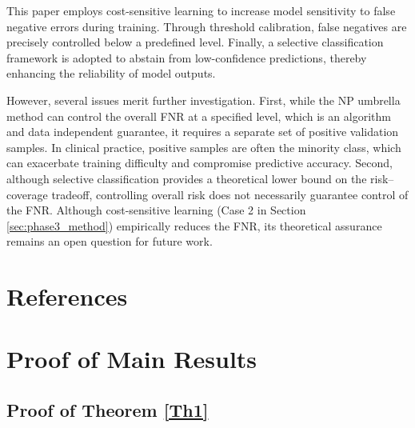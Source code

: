 \documentclass[journal,twoside,web]{ieeecolor}
\begin{document}
This paper employs cost-sensitive learning to increase model sensitivity to false negative errors during training. Through threshold calibration, false negatives are precisely controlled below a predefined level. Finally, a selective classification framework is adopted to abstain from low-confidence predictions, thereby enhancing the reliability of model outputs.

However, several issues merit further investigation. First, while the NP umbrella method can control the overall FNR at a specified level, which is an algorithm and data independent guarantee, it requires a separate set of positive validation samples. In clinical practice, positive samples are often the minority class, which can exacerbate training difficulty and compromise predictive accuracy. Second, although selective classification provides a theoretical lower bound on the risk–coverage tradeoff, controlling overall risk does not necessarily guarantee control of the FNR. Although cost-sensitive learning (Case 2 in Section \ref{sec:phase3_method}) empirically reduces the FNR, its theoretical assurance remains an open question for future work.


\section*{References}





\appendices

\section{Proof of Main Results}\label{S6}

\subsection{Proof of Theorem \ref{Th1}}\label{S6-1}
\end{document}
